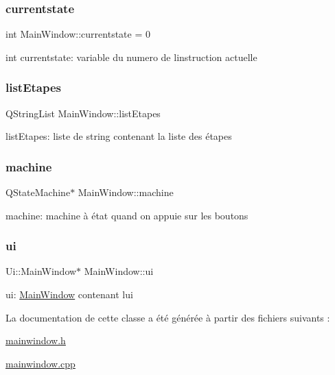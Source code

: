 \subsubsection{\texorpdfstring{currentstate}{currentstate}}
{\footnotesize\ttfamily int Main\+Window\+::currentstate = 0\hspace{0.3cm}{\ttfamily [private]}}

int currentstate\+: variable du numero de l\textquotesingle{}instruction actuelle \mbox{\label{classMainWindow_a1290f4c9df65fb27c870753aa2b24a88}} 
\subsubsection{\texorpdfstring{list\+Etapes}{listEtapes}}
{\footnotesize\ttfamily Q\+String\+List Main\+Window\+::list\+Etapes\hspace{0.3cm}{\ttfamily [private]}}

list\+Etapes\+: liste de string contenant la liste des étapes \mbox{\label{classMainWindow_af5f0afb6c5f81e4438f98f93f918ea8b}} 
\subsubsection{\texorpdfstring{machine}{machine}}
{\footnotesize\ttfamily Q\+State\+Machine$\ast$ Main\+Window\+::machine\hspace{0.3cm}{\ttfamily [private]}}

machine\+: machine à état quand on appuie sur les boutons \mbox{\label{classMainWindow_a35466a70ed47252a0191168126a352a5}} 
\subsubsection{\texorpdfstring{ui}{ui}}
{\footnotesize\ttfamily Ui\+::\+Main\+Window$\ast$ Main\+Window\+::ui\hspace{0.3cm}{\ttfamily [private]}}

ui\+: \hyperlink{classMainWindow}{Main\+Window} contenant l\textquotesingle{}ui 

La documentation de cette classe a été générée à partir des fichiers suivants \+:\begin{DoxyCompactItemize}
\item 
\hyperlink{mainwindow_8h}{mainwindow.\+h}\item 
\hyperlink{mainwindow_8cpp}{mainwindow.\+cpp}\end{DoxyCompactItemize}
